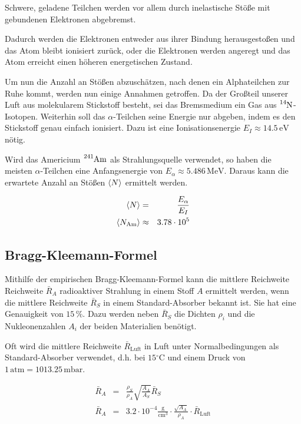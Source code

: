 \documentclass[12pt,a4paper]{scrartcl}
\numberwithin{equation}{section} %
\renewcommand{\[}{} %
\renewcommand{\]}{\noindent} %
\begin{document}
Schwere, geladene Teilchen werden vor allem durch inelastische Stöße mit
gebundenen Elektronen abgebremst.

Dadurch werden die Elektronen entweder aus ihrer Bindung herausgestoßen
und das Atom bleibt ionisiert zurück, oder die Elektronen werden
angeregt und das Atom erreicht einen höheren energetischen Zustand.

Um nun die Anzahl an Stößen abzuschätzen, nach denen ein Alphateilchen
zur Ruhe kommt, werden nun einige Annahmen getroffen. Da der Großteil
unserer Luft aus molekularem Stickstoff besteht, sei das Bremsmedium ein
Gas aus $\ce{^{14}N}$-Isotopen. Weiterhin soll das $\alpha$-Teilchen
seine Energie nur abgeben, indem es den Stickstoff genau einfach
ionisiert. Dazu ist eine Ionisationsenergie
$E_I\approx 14.5 \mathrm{\,eV}$ nötig.

Wird das Americium $\ce{^{241}Am}$ als Strahlungsquelle verwendet, so
haben die meisten $\alpha$-Teilchen eine Anfangsenergie von
$E_\alpha\approx 5.486 \mathrm{\,MeV}$. Daraus kann die erwartete
Anzahl an Stößen $\expval{N}$ ermittelt werden.

\[
\begin{eqnarray}
        \expval{N} &=& \frac{E_\alpha}{E_I} \\
    \expval{N_\mathrm{Am}} &\approx& 3.78 \cdot 10^5
\end{eqnarray}
\]

\subsection{Bragg-Kleemann-Formel}\label{Bragg-Kleemann-Formel}
Mithilfe der empirischen
Bragg-Kleemann-Formel kann die mittlere Reichweite Reichweite
$\bar R_A$ radioaktiver Strahlung in einem Stoff $A$ ermittelt
werden, wenn die mittlere Reichweite $\bar R_S$ in einem
Standard-Absorber bekannt ist. Sie hat eine Genauigkeit von $15\,\%$.
Dazu werden neben $\bar R_S$ die Dichten $\rho_i$ und die
Nukleonenzahlen $A_i$ der beiden Materialien benötigt.

Oft wird die mittlere Reichweite $\bar R_\mathrm{Luft}$ in Luft unter
Normalbedingungen als Standard-Absorber verwendet, d.h. bei
$15\mathrm{^\circ C}$ und einem Druck von
$1\mathrm{\,atm}=1013.25\mathrm{\,mbar}$.

\[
\begin{eqnarray}
        \bar R_A &=& \frac{\rho_S}{\rho_A}
                \sqrt{\frac{A_A}{A_S}} \bar R_S \\
        \bar R_A &=& 3.2\cdot 10^{-4} \mathrm{\frac{g}{cm^3}}
                \cdot\frac{\sqrt{A_A}}{\rho_A}\cdot \bar R_\mathrm{Luft}
\end{eqnarray}
\]
\end{document}
